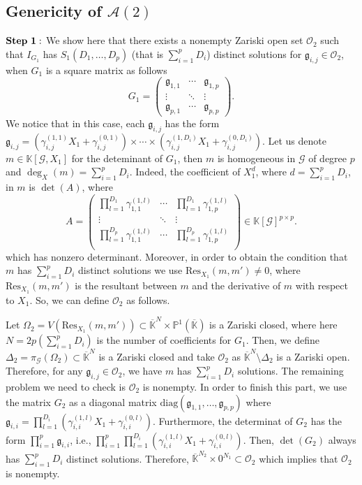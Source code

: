 \documentclass[11pt]{article}
\numberwithin{Property}{section}
\numberwithin{Theorem}{section}
\numberwithin{Proposition}{section}
\numberwithin{Lemma}{section}
\numberwithin{Corollary}{section}
\numberwithin{Definition}{section}
\numberwithin{Remark}{section}
\numberwithin{Conjecture}{section}
\numberwithin{Problem}{section}
\numberwithin{Example}{section}
\numberwithin{Claim}{section}
\def\bar{\overline}
\newcommand{\field}{\mathbb{K}} %
\begin{document}
\subsection{Genericity of $\mathcal{A}(2)$}
$\bf{Step \ 1:}$ We show here that there exists a nonempty Zariski open set $\mathcal{O}_2$ such that $I_{G_1}$ has $S_1(D_1, \ldots, D_p)$ (that is $\sum_{i=1}^pD_i$) distinct solutions for $\mathfrak{g}_{i,j} \in \mathcal{O}_2$, when $G_1$ is a square matrix as follows
\[
G_1 = \left( \begin{matrix}
\mathfrak{g}_{1,1}  & \cdots  & \mathfrak{g}_{1, p}\\
\vdots & \ddots & \vdots \\
\mathfrak{g}_{p,1} & \cdots  & \mathfrak{g}_{p, p}
\end{matrix} \right).
\] We notice that in this case, each $\mathfrak{g}_{i,j}$ has the form $\mathfrak{g}_{i,j} = (\gamma_{i,j}^{(1,1)}X_1 + \gamma_{i,j}^{(0,1)}) \times \cdots \times (\gamma_{i,j}^{(1,D_i)}X_1 + \gamma_{i,j}^{(0,D_i)})$. Let us denote $m \in \field[\mathcal{G}, X_1]$ for the deteminant of $G_1$, then $m$ is homogeneous in $\mathcal{G}$ of degree $p$ and $\deg_X(m) = \sum_{i=1}^pD_i$. Indeed, the coefficient of $X_1^{d}$, where $d = \sum_{i=1}^pD_i$, in $m$ is $\det(A)$, where 
\[
A = \left( \begin{matrix}
\prod_{l=1}^{D_1}\gamma_{1,1}^{(1,l)}  & \cdots  & \prod_{l=1}^{D_1}\gamma_{1,p}^{(1,l)}\\
\vdots & \ddots & \vdots \\
\prod_{l=1}^{D_p}\gamma_{1,1}^{(1,l)}  & \cdots  & \prod_{l=1}^{D_p}\gamma_{1,p}^{(1,l)}\\
\end{matrix} \right) \in \field[\mathcal{G}]^{p \times p}.
\] which has nonzero determinant. Moreover, in order to obtain the condition that $m$ has $\sum_{i=1}^pD_i$ distinct solutions we use $\mathrm{Res}_{X_1}(m, m') \ne 0$, where $\mathrm{Res}_{X_1}(m, m')$ is the resultant between $m$ and the derivative of $m$ with respect to $X_1$. So, we can define $\mathcal{O}_2$ as follows. 

Let $\Omega_2 = V(\mathrm{Res}_{X_1}(m, m')) \subset \bar{\field}^{N} \times \mathbb{P}^1(\bar{\field})$ is a Zariski closed, where here $N = 2p(\sum_{i=1}^pD_i)$ is the number of coefficients for $G_1$. Then, we define $\Delta_2 = \pi_{\mathcal{G}}(\Omega_2) \subset \bar{\field}^{N}$ is a Zariski closed and take $\mathcal{O}_2$ as $\bar{\field}^{N} \setminus \Delta_2$ is a Zariski open. Therefore, for any $\mathfrak{g}_{i,j} \in \mathcal{O}_2$, we have $m$ has $\sum_{i=1}^pD_i$ solutions. The remaining problem we need to check is $\mathcal{O}_2$ is nonempty. In order to finish this part, we use the matrix $G_2$ as a diagonal matrix $\mathrm{diag}(\mathfrak{g}_{1,1}, \ldots, \mathfrak{g}_{p,p})$ where $\mathfrak{g}_{i,i} = \prod_{l=1}^{D_i}(\gamma_{i,i}^{(1,l)}X_1 + \gamma_{i,i}^{(0,l)})$. Furthermore, the determinat of $G_2$ has the form $\prod_{i=1}^p\mathfrak{g}_{i,i}$, i.e., $\prod_{i=1}^p\prod_{l=1}^{D_i}(\gamma_{i,i}^{(1,l)}X_1 + \gamma_{i,i}^{(0,l)})$. Then, $\det(G_2)$ always has $\sum_{i=1}^pD_i$  distinct solutions. Therefore, $\bar{\field}^{N_2} \times 0^{N_1} \subset \mathcal{O}_2$ which implies that $\mathcal{O}_2$ is nonempty. 
\end{document}
